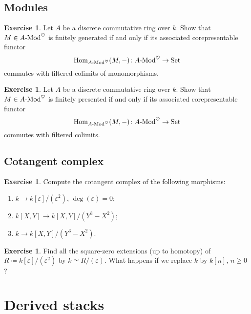 \documentclass[10pt,a4paper,reqno,oneside]{book} %
\theoremstyle{plain}
\theoremstyle{definition}
\newtheorem{exercise}[thm]{Exercise}
\theoremstyle{remark}
\numberwithin{equation}{section}
\begin{document}
\section{Modules}

\begin{exercise}
	Let $A$ be a discrete commutative ring over $k$.
	Show that $M \in A\textrm{-}\mathrm{Mod}^\heartsuit$ is finitely generated if and only if its associated corepresentable functor
	\[ \operatorname{Hom}_{A\textrm{-}\mathrm{Mod}^\heartsuit}(M,-) \colon A \textrm{-}\mathrm{Mod}^\heartsuit \to \mathrm{Set} \]
	commutes with filtered colimits of monomorphisms.
\end{exercise}

\begin{exercise}
	Let $A$ be a discrete commutative ring over $k$.
	Show that $M \in A \textrm{-}\mathrm{Mod}^\heartsuit$ is finitely presented if and only if its associated corepresentable functor
	\[ \operatorname{Hom}_{A\textrm{-}\mathrm{Mod}^\heartsuit}(M,-) \colon A \textrm{-}\mathrm{Mod}^\heartsuit \to \mathrm{Set} \]
	commutes with filtered colimits.
\end{exercise}

\section{Cotangent complex}

\begin{exercise}
	Compute the cotangent complex of the following morphisms:
	\begin{enumerate}
		\item $k \to k[\varepsilon] / (\varepsilon^2)$, $\deg(\varepsilon) = 0$;
		\item $k[X,Y] \to k[X,Y] / (Y^3 - X^2)$;
		\item $k \to k[X,Y] / (Y^3 - X^2)$.
	\end{enumerate}
\end{exercise}

\begin{exercise}
	Find all the square-zero extensions (up to homotopy) of $R \coloneqq k[\varepsilon] / (\varepsilon^2)$ by $k \simeq R / (\varepsilon)$.
	What happens if we replace $k$ by $k[n]$, $n \ge 0$?
\end{exercise}

\chapter{Derived stacks}





\end{document}
